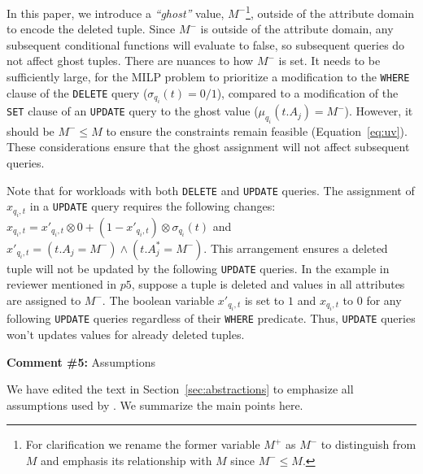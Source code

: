 
In this paper, we introduce a \emph{``ghost''} value, 
$M^-$\footnote{For clarification we rename the former variable $M^+$ as $M^-$ to distinguish
from $M$ and emphasis its relationship with $M$ since $M^- \leq M$.}, outside of the attribute domain
to encode the deleted tuple.
Since $M^-$ is outside of the attribute domain, any subsequent conditional functions will
evaluate to false, so subsequent queries do not affect ghost tuples. There are
nuances to how $M^-$ is set. It needs to be sufficiently large, for the MILP
problem to prioritize a modification to the \texttt{WHERE} clause of the
\texttt{DELETE} query ($\sigma_{q_i}(t) = 0/1$), compared to a modification of
the \texttt{SET} clause of an \texttt{UPDATE} query to the ghost value
($\mu_{q_i}(t.A_j) = M^-$). However, it should be $M^- \leq M $ to ensure the
constraints remain feasible (Equation~\ref{eq:uv}). These considerations
ensure that the ghost assignment will not affect subsequent queries.

Note that for workloads with both \texttt{DELETE} and \texttt{UPDATE} queries.
The assignment of $x_{q_i, t}$ in a \texttt{UPDATE} query 
requires the following changes:
$x_{q_i, t} = x'_{q_i, t} \otimes 0 + (1-x'_{q_i, t}) \otimes \sigma_{q_i}(t)$ and
$x'_{q_i, t}= (t.A_j = M^-) \wedge (t.A_j^* = M^-)$.
This arrangement ensures a deleted tuple will not be updated by the following \texttt{UPDATE} queries. 
In the example in reviewer mentioned in $p5$, suppose a tuple is deleted and values in all attributes are assigned to $M^-$. 
The boolean variable $x'_{q_i, t}$ is set to $1$ and $x_{q_i, t} $ to $0$ for any following \texttt{UPDATE} queries regardless
of their \texttt{WHERE} predicate. Thus, \texttt{UPDATE} queries won't updates values for already deleted tuples. 

\comskip

\noindent
\textbf{Comment \#5:} Assumptions
\begin{quote}
\end{quote}

We have edited the text in Section~\ref{sec:abstractions} to emphasize all assumptions used by \sys.  We summarize the main points here.

